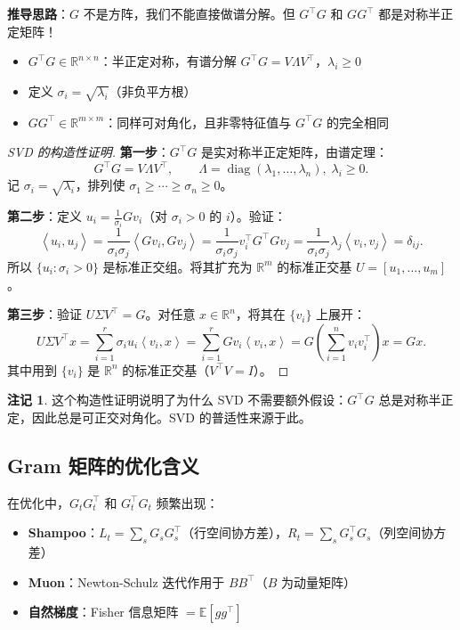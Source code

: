\documentclass[12pt,a4paper]{ctexart}
\theoremstyle{definition}
\newtheorem{remark}{注记}[section]
\theoremstyle{plain}
\newcommand{\R}{\mathbb{R}}
\newcommand{\E}{\mathbb{E}}
\newcommand{\diag}{\operatorname{diag}}
\newcommand{\ip}[2]{\left\langle #1,#2 \right\rangle}
\begin{document}
\textbf{推导思路}：$G$ 不是方阵，我们不能直接做谱分解。但 $G^\top G$ 和 $GG^\top$ 都是对称半正定矩阵！

\begin{itemize}
  \item $G^\top G \in \R^{n\times n}$：半正定对称，有谱分解 $G^\top G = V\Lambda V^\top$，$\lambda_i\ge0$
  \item 定义 $\sigma_i = \sqrt{\lambda_i}$（非负平方根）
  \item $GG^\top \in \R^{m\times m}$：同样可对角化，且非零特征值与 $G^\top G$ 的完全相同
\end{itemize}

\begin{proof}[SVD 的构造性证明]
  \textbf{第一步}：$G^\top G$ 是实对称半正定矩阵，由谱定理：
  \[
    G^\top G = V\Lambda V^\top,\qquad \Lambda=\diag(\lambda_1,\ldots,\lambda_n),\;\lambda_i\ge0.
  \]
  记 $\sigma_i=\sqrt{\lambda_i}$，排列使 $\sigma_1\ge\cdots\ge\sigma_n\ge0$。

  \textbf{第二步}：定义 $u_i = \frac{1}{\sigma_i} G v_i$（对 $\sigma_i>0$ 的 $i$）。验证：
  \[
    \ip{u_i}{u_j} = \frac{1}{\sigma_i\sigma_j}\ip{G v_i}{G v_j}
    = \frac{1}{\sigma_i\sigma_j} v_i^\top G^\top G v_j
    = \frac{1}{\sigma_i\sigma_j} \lambda_j \ip{v_i}{v_j} = \delta_{ij}.
  \]
  所以 $\{u_i: \sigma_i>0\}$ 是标准正交组。将其扩充为 $\R^m$ 的标准正交基 $U=[u_1,\ldots,u_m]$。

  \textbf{第三步}：验证 $U\Sigma V^\top = G$。对任意 $x\in\R^n$，将其在 $\{v_i\}$ 上展开：
  \[
    U\Sigma V^\top x = \sum_{i=1}^r \sigma_i u_i \ip{v_i}{x}
    = \sum_{i=1}^r G v_i \ip{v_i}{x}
    = G\left(\sum_{i=1}^n v_i v_i^\top\right) x = G x.
  \]
  其中用到 $\{v_i\}$ 是 $\R^n$ 的标准正交基（$V^\top V=I$）。
\end{proof}

\begin{remark}
  这个构造性证明说明了为什么 SVD 不需要额外假设：$G^\top G$ 总是对称半正定，因此总是可正交对角化。SVD 的普适性来源于此。
\end{remark}

\subsection{Gram 矩阵的优化含义}

在优化中，$G_t G_t^\top$ 和 $G_t^\top G_t$ 频繁出现：

\begin{itemize}
  \item \textbf{Shampoo}：$L_t = \sum_s G_s G_s^\top$（行空间协方差），$R_t = \sum_s G_s^\top G_s$（列空间协方差）
  \item \textbf{Muon}：Newton-Schulz 迭代作用于 $BB^\top$（$B$ 为动量矩阵）
  \item \textbf{自然梯度}：Fisher 信息矩阵 $= \E[g g^\top]$
\end{itemize}
\end{document}
